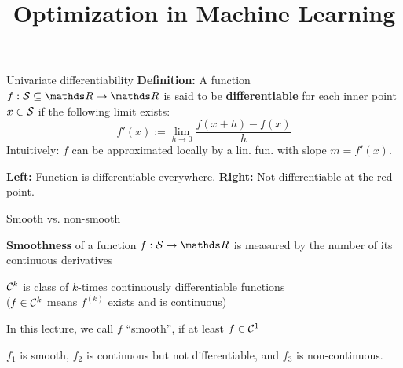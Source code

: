 \documentclass[11pt,compress,t,notes=noshow, xcolor=table]{beamer}
\title{Optimization in Machine Learning}
\begin{document}

\begin{framev}{Univariate differentiability}
\textbf{Definition:} A function $f: \S \subseteq \R \to \R$ is said to be \textbf{differentiable} for each inner point $x \in \S$ if the following limit exists:
$$
f'(x) := \lim_{h \to 0} \frac{f(x + h) - f(x)}{h}
$$
Intuitively: $f$ can be approximated locally by a lin. fun. with slope $m = f'(x)$.
\vfill
{}
\begin{center}
\begin{footnotesize}
\textbf{Left:} Function is differentiable everywhere.
\textbf{Right:} Not differentiable at the red point.
\end{footnotesize}
\end{center}
\end{framev}


\begin{framei}{Smooth vs. non-smooth}
\item \textbf{Smoothness} of a function $f: \S \to \R$ is measured by the number of its continuous derivatives
\item $\CC{k}$ is class of $k$-times continuously differentiable functions\\
($f\in\CC{k}$ means $f^{(k)}$ exists and is continuous)
\item In this lecture, we call $f$ ``smooth'', if at least $f \in \CC{1}$
\vfill
{}
\begin{center}
\begin{footnotesize}
$f_1$ is smooth, $f_2$ is continuous but not differentiable, and $f_3$ is non-continuous.
\end{footnotesize}
\end{center}
\end{framei}
\end{document}
